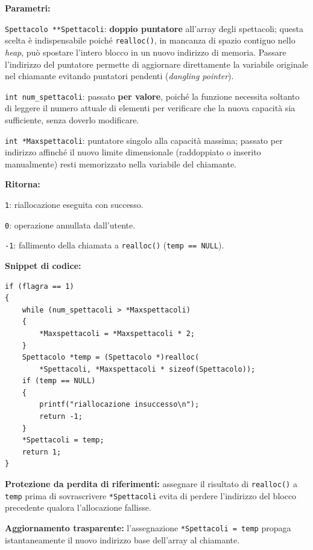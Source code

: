 \documentclass[11pt,a4paper,oneside,openany]{book}
\newenvironment{listacomp}{%
    \small
    \begin{list}{\textendash}{%
        \setlength{\topsep}{2pt}%
        \setlength{\partopsep}{0pt}%
        \setlength{\itemsep}{1pt}%
        \setlength{\parsep}{0pt}%
        \setlength{\leftmargin}{1.2em}%
    }%
}{%
    \end{list}%
}
\begin{document}
\noindent\textbf{Parametri:}
\begin{listacomp}
    \item \texttt{Spettacolo **Spettacoli}: \textbf{doppio puntatore} all'array degli spettacoli; questa scelta è indispensabile poiché \texttt{realloc()}, in mancanza di spazio contiguo nello \emph{heap}, può spostare l'intero blocco in un nuovo indirizzo di memoria. Passare l'indirizzo del puntatore permette di aggiornare direttamente la variabile originale nel chiamante evitando puntatori pendenti (\emph{dangling pointer}).
    \item \texttt{int num\_spettacoli}: passato \textbf{per valore}, poiché la funzione necessita soltanto di leggere il numero attuale di elementi per verificare che la nuova capacità sia sufficiente, senza doverlo modificare.
    \item \texttt{int *Maxspettacoli}: puntatore singolo alla capacità massima; passato per indirizzo affinché il nuovo limite dimensionale (raddoppiato o inserito manualmente) resti memorizzato nella variabile del chiamante.
\end{listacomp}

\noindent\textbf{Ritorna:}
\begin{listacomp}
    \item \texttt{1}: riallocazione eseguita con successo.
    \item \texttt{0}: operazione annullata dall'utente.
    \item \texttt{-1}: fallimento della chiamata a \texttt{realloc()} (\texttt{temp == NULL}).
\end{listacomp}

\noindent\textbf{Snippet di codice:}
\begin{lstlisting}[caption={Ridimensionamento sicuro tramite puntatore temporaneo in riallocazioneSp()}]
if (flagra == 1)
{
    while (num_spettacoli > *Maxspettacoli)
    {
        *Maxspettacoli = *Maxspettacoli * 2;
    }
    Spettacolo *temp = (Spettacolo *)realloc(
        *Spettacoli, *Maxspettacoli * sizeof(Spettacolo));
    if (temp == NULL)
    {
        printf("riallocazione insuccesso\n");
        return -1;
    }
    *Spettacoli = temp;
    return 1;
}
\end{lstlisting}

\begin{listacomp}
    \item \textbf{Protezione da perdita di riferimenti:} assegnare il risultato di \texttt{realloc()} a \texttt{temp} prima di sovrascrivere \texttt{*Spettacoli} evita di perdere l'indirizzo del blocco precedente qualora l'allocazione fallisse.
    \item \textbf{Aggiornamento trasparente:} l'assegnazione \texttt{*Spettacoli = temp} propaga istantaneamente il nuovo indirizzo base dell'array al chiamante.
\end{listacomp}
\end{document}
